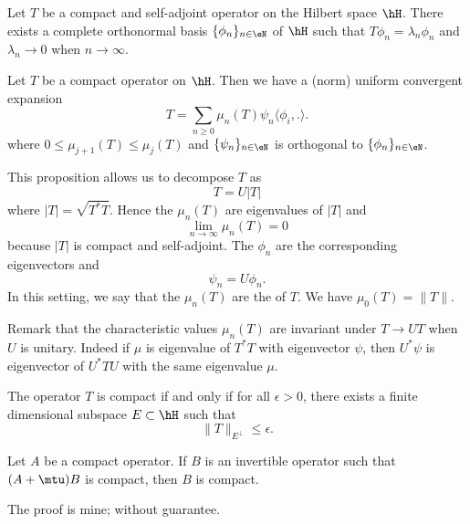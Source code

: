\begin{proposition}
Let $T$ be a compact and self-adjoint operator on the Hilbert space $\hH$. There exists a complete orthonormal basis $\{ \phi_n \}_{n\in\eN}$ of $\hH$ such that $T\phi_n=\lambda_n\phi_n$ and $\lambda_n\to0$ when $n\to\infty$.
\end{proposition}

\begin{proposition}
Let $T$ be a compact operator on $\hH$. Then we have a (norm) uniform convergent expansion
\[
  T=\sum_{n\geq 0}\mu_n(T)\psi_n\langle \phi_i, .\rangle .
\]
where $0\leq\mu_{j+1}(T)\leq\mu_j(T)$ and $\{ \psi_n \}_{n\in\eN}$ is orthogonal to $\{ \phi_n \}_{n\in\eN}$.
\end{proposition}

This proposition allows us to decompose $T$ as
\[
  T=U| T |
\]
where $| T |=\sqrt{T^*T}$. Hence the $\mu_n(T)$ are eigenvalues of $| T |$ and
\[
  \lim_{n\to\infty}\mu_n(T)=0
\]
because $| T |$ is compact and self-adjoint. The $\phi_n$ are the corresponding eigenvectors and
\[
  \psi_n=U\phi_n.
\]
 In this setting, we say that the $\mu_n(T)$ are the  of $T$. We have $\mu_0(T)=\| T \|$.

Remark\label{pg_char_inv_U} that the characteristic values $\mu_n(T)$ are invariant under $T\to UT$ when $U$ is unitary. Indeed if $\mu$ is eigenvalue of $T^*T$ with eigenvector $\psi$, then $U^*\psi$ is eigenvector of $U^*TU$ with the same eigenvalue $\mu$.

\begin{proposition}
The operator $T$ is compact if and only if for all $\epsilon>0$, there exists a finite dimensional subspace $E\subset \hH$ such that
\[
  \| T \|_{E^{\perp}}\leq\epsilon.
\]
 \label{prop_comp_ini}
\end{proposition}

\begin{lemma}		\label{LemAmtuBcompaBcm}
	Let $A$ be a compact operator. If $B$ is an invertible operator such that $(A+\mtu)B$ is compact, then $B$ is compact.
\end{lemma}

\begin{probleme}
	The proof is mine; without guarantee.
\end{probleme}


